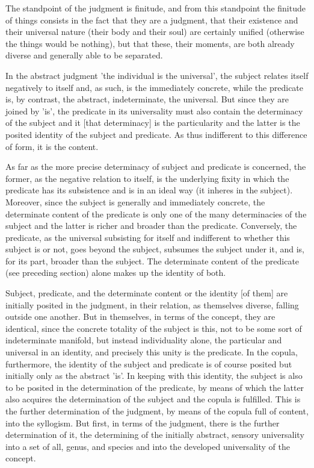 The standpoint of the judgment is finitude, and from this standpoint the
finitude of things consists in the fact that they are a judgment,
that their existence and their universal nature (their body and their soul) are
certainly unified (otherwise the things would be nothing), but that these,
their moments, are both already diverse and generally able to be separated.

In the abstract judgment 'the individual is the universal',
the subject relates itself negatively to itself and, as such,
is the immediately concrete, while the predicate is, by contrast,
the abstract, indeterminate, the universal.
But since they are joined by 'is', the predicate in its universality
must also contain the determinacy of the subject
and it [that determinacy] is the particularity
and the latter is the posited identity of the subject and predicate.
As thus indifferent to this difference of form, it is the content.

As far as the more precise determinacy of subject and predicate is concerned,
the former, as the negative relation to itself, is the
underlying fixity in which the predicate has its subsistence
and is in an ideal way (it inheres in the subject).
Moreover, since the subject is generally and immediately concrete,
the determinate content of the predicate is only one of the many
determinacies of the subject and the latter is richer and broader than the predicate.
Conversely, the predicate, as the universal subsisting for itself and
indifferent to whether this subject is or not, goes beyond the subject,
subsumes the subject under it, and is, for its part, broader than the subject.
The determinate content of the predicate (see preceding section)
alone makes up the identity of both.

Subject, predicate, and the determinate content or the identity [of them]
are initially posited in the judgment, in their relation, as themselves diverse,
falling outside one another.
But in themselves, in terms of the concept, they are identical,
since the concrete totality of the subject is this,
not to be some sort of indeterminate manifold, but instead individuality alone,
the particular and universal in an identity, and precisely this unity is the predicate.
In the copula, furthermore, the identity of the subject and predicate is
of course posited but initially only as the abstract 'is'.
In keeping with this identity, the subject is also to be posited in
the determination of the predicate, by means of which the latter also acquires
the determination of the subject and the copula is fulfilled.
This is the further determination of the judgment,
by means of the copula full of content, into the syllogism.
But first, in terms of the judgment, there is the further determination of it,
the determining of the initially abstract, sensory universality into
a set of all, genus, and species and into the developed universality of the concept.

